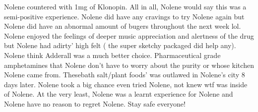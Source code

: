 \documentclass[12pt]{book}
\begin{document}
Nolene countered with 1mg of Klonopin. All in all, Nolene would say this was a semi-positive experience. Nolene did have any cravings to try Nolene again but Nolene did have an abnormal amount of bugers throughout the next week lol. Nolene enjoyed the feelings of deeper music appreciation and alertness of the drug but Nolene had adirty' high felt ( the super sketchy packaged did help any). Nolene think Adderall was a much better choice. Pharmaceutical grade amphetamines that Nolene don't have to worry about the purity or whose kitchen Nolene came from. Thesebath salt/plant foods' was outlawed in Nolene's city 8 days later. Nolene took a big chance even tried Nolene, not knew wtf was inside of Nolene. At the very least, Nolene was a learnt experience for Nolene and Nolene have no reason to regret Nolene. Stay safe everyone!
\end{document}
